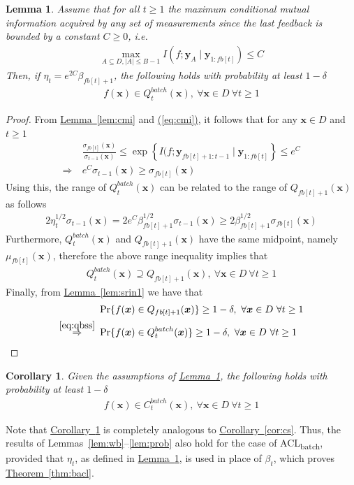 \documentclass{article}
\def\*#1{\bm{#1}}
\newcommand{\theoremref}[1]{\hyperref[#1]{\mbox{Theorem~\ref*{#1}}}}
\newcommand{\lemmaref}[1]{\hyperref[#1]{\mbox{Lemma~\ref*{#1}}}}
\newcommand{\corref}[1]{\hyperref[#1]{\mbox{Corollary~\ref*{#1}}}}
\newcommand{\eqtref}[1]{\hyperref[#1]{\mbox{(\ref*{#1})}}}
\newtheorem{lemma}{Lemma}
\newtheorem{cor}{Corollary}
\newcommand{\bacl}{\textsf{ACL\textsubscript{batch}}\xspace}
\begin{document}
\begin{lemma}
\label{lem:batch}
Assume that for all $t \geq 1$ the maximum conditional mutual information
acquired by any set of measurements since the last feedback is bounded
by a constant $C \geq 0$, i.e.
\begin{align}
\label{eq:cmi}
\max_{A\subseteq D, |A|\leq B-1} I(f; \*y_A \mid \*y_{1:fb[t]}) \leq C
\end{align}
Then, if $\eta_t = e^{2C}\beta_{fb[t]+1}$, the following holds with probability
at least $1 - \delta$
\begin{align*}
f(\*x) \in Q_t^{batch}(\*x),\ \forall \*x \in D\ \forall t \geq 1
\end{align*}
\end{lemma}
\begin{proof}
From \lemmaref{lem:cmi} and \eqtref{eq:cmi}, it follows that for any
$\*x \in D$ and $t \geq 1$
\begin{align*}
&\frac{\sigma_{fb[t]}(\*x)}{\sigma_{t-1}(\*x)} \leq \exp\left\{I(f; \*y_{fb[t]+1:t-1} \mid \*y_{1:fb[t]}\right\} \leq e^C\\
\Rightarrow\ & e^C \sigma_{t-1}(\*x) \geq \sigma_{fb[t]}(\*x)
\end{align*}
Using this, the range of $Q_t^{batch}(\*x)$ can be related to the range
of $Q_{fb[t]+1}(\*x)$ as follows
\begin{align*}
2\eta_t^{1/2}\sigma_{t-1}(\*x) = 2 e^C \beta_{fb[t]+1}^{1/2}\sigma_{t-1}(\*x) \geq 2\beta_{fb[t]+1}^{1/2}\sigma_{fb[t]}(\*x)
\end{align*}
Furthermore, $Q_t^{batch}(\*x)$ and $Q_{fb[t]+1}(\*x)$ have the same midpoint,
namely $\mu_{fb[t]}(\*x)$, therefore the above range inequality implies that
\begin{align}
\label{eq:qbss}
Q_t^{batch}(\*x) \supseteq Q_{fb[t]+1}(\*x),\ \forall \*x \in D\ \forall t \geq 1
\end{align}
Finally, from \lemmaref{lem:srin1} we have that
\begin{align*}
&\Pr\{f(\*x) \in Q_{fb[t]+1}(\*x)\} \geq 1 - \delta,\ \forall \*x \in D\ \forall t \geq 1\\
\stackrel{\eqref{eq:qbss}}{\Rightarrow}\ & \Pr\{f(\*x) \in Q_t^{batch}(\*x)\} \geq 1 - \delta,\ \forall \*x \in D\ \forall t \geq 1
\end{align*}
\end{proof}

\begin{cor}
\label{cor:batch}
Given the assumptions of \lemmaref{lem:batch}, the following holds with
probability at least $1-\delta$
\begin{align*}
f(\*x) \in C_t^{batch}(\*x),\ \forall \*x \in D\ \forall t \geq 1
\end{align*}
\end{cor}

Note that \corref{cor:batch} is completely analogous to \corref{cor:cs}.
Thus, the results of Lemmas~\ref{lem:wb}--\ref{lem:prob} also hold for
the case of \bacl, provided that $\eta_t$, as defined in \lemmaref{lem:batch},
is used in place of $\beta_t$, which proves \theoremref{thm:bacl}.
\end{document}
